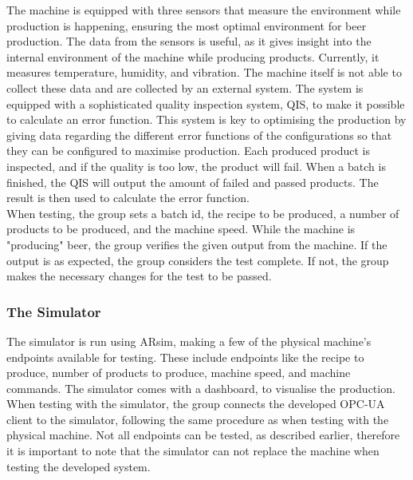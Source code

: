 The machine is equipped with three sensors that measure the environment while
production is happening, ensuring the most optimal environment for beer
production. The data from the sensors is useful, as it gives insight into the
internal environment of the machine while producing products. Currently, it
measures temperature, humidity, and vibration. The machine itself is not able to
collect these data and are collected by an external system. The system is
equipped with a sophisticated quality inspection system, QIS, to make it
possible to calculate an error function. This system is key to optimising the
production by giving data regarding the different error functions of the
configurations so that they can be configured to maximise production.
Each produced product is inspected, and if the quality is too low, the
product will fail. When a batch is finished, the QIS will output the amount of
failed and passed products. The result is then used to calculate the error
function. \\

When testing, the group sets a batch id, the recipe to be produced, a number of
products to be produced, and the machine speed. While the machine is "producing"
beer, the group verifies the given output from the machine. If the output is as
expected, the group considers the test complete. If not, the group makes the
necessary changes for the test to be passed. 


\subsubsection{The Simulator}
The simulator is run using ARsim, making a few of the physical machine's endpoints
available for testing. These include endpoints like the recipe to produce,
number of products to produce, machine speed, and machine commands. The
simulator comes with a dashboard, to visualise the production. \\

When testing with the simulator, the group connects the developed OPC-UA client
to the simulator, following the same procedure as when testing with the
physical machine. Not all endpoints can be tested, as described earlier,
therefore it is important to note that the simulator can not replace the machine
when testing the developed system.
